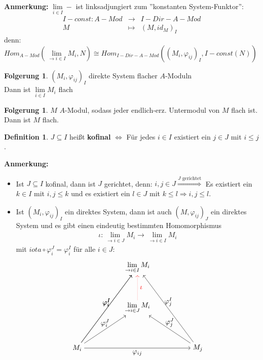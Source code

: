 \documentclass[10pt,a4paper,numbers=endperiod]{scrreprt}
\theoremstyle{definition}
\newtheorem{defi}[satz]{Definition}
\newtheorem{folg}[satz]{Folgerung}
\begin{document}
\textbf{Anmerkung:} $\lim\limits_{i \in I} -$ ist linksadjungiert zum ''konstanten System-Funktor'': \begin{eqnarray*}
	I-const: A-Mod &\longrightarrow& I-Dir-A-Mod\\
	M &\longmapsto& (M, id_M)_I
\end{eqnarray*}
denn: $Hom_{A-Mod} (\lim\limits_{\to i \in I} M_i, N) \cong Hom_{I-Dir-A-Mod} ((M_i, \varphi_{ij})_I, I-const(N))$

\begin{folg}
	$(M_i, \varphi_{ij})_I$ direkte System flacher $A$-Moduln\\
	Dann ist $\lim\limits_{i \in I} M_i$ flach
\end{folg}

\begin{folg}
	$M$ $A$-Modul, sodass jeder endlich-erz. Untermodul von $M$ flach ist. Dann ist $M$ flach.
\end{folg}

\begin{defi}
	$J \subseteq I$ heißt \textbf{kofinal} $\Leftrightarrow$ Für jedes $i \in I$ existiert ein $j \in J$ mit $i \leq j$.
\end{defi}

\textbf{Anmerkung:} \begin{itemize}
	\item Ist $J \subseteq I$ kofinal, dann ist $J$ gerichtet, denn: $i, j \in J \overset{J \text{ gerichtet}}{\Rightarrow}$ Es existiert ein $k \in I$ mit $i, j \leq k$ und es existiert ein $l \in J$ mit $k \leq l \Rightarrow i,j \leq l$.
	\item Ist $(M_i, \varphi_{ij})_I$ ein direktes System, dann ist auch $(M, \varphi_{ij})_J$ ein direktes System und es gibt einen eindeutig bestimmten Homomorphismus \begin{align*}
		\iota: \lim\limits_{\to i \in J} M_i \longrightarrow \lim\limits_{\to i \in I} M_i
	\end{align*}
	mit $iota \circ \varphi_i^J = \varphi_i^I$ für alle $i \in J$: \begin{align*}
		\begin{tikzpicture}{
			\node (01) at (5,6) {$ \lim\limits_{\to i \in I} M_i $};
			\node (02) at (5,4) {$ \lim\limits_{\to i \in J} M_i $};
			\node (03) at (2,2) {$ M_i $};
			\node (04) at (8,2) {$ M_j $};
			\draw[->] (03) edge node[above] {$ \varphi_i^I $} (01);
			\draw[->] (04) edge node[above] {$ \varphi_j^I $} (01);
			\draw[->] (03) edge node[above] {$ \varphi_i^J $} (02);
			\draw[->] (03) edge node[below] {$ \varphi_{ij} $} (04);
			\draw[->] (04) edge node[above] {$ \varphi_j^J $} (02);
			\draw[red][->, densely dotted] (02) edge node[right] {$ \iota $} (01);
			\draw[->] (03) edge node[above] {$ \varphi_i^I $} (01);
		}
		\end{tikzpicture} 
	\end{align*}
\end{itemize}
\end{document}
